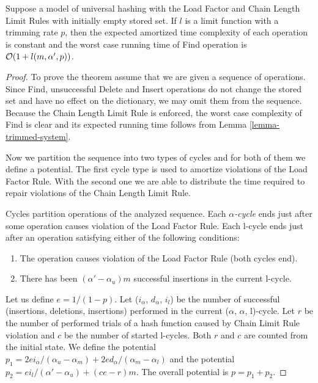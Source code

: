 \begin{theorem}
\label{theorem-amortised-expected-time}
Suppose a model of universal hashing with the Load Factor and Chain Length Limit Rules with initially empty stored set. If $l$ is a limit function with a trimming rate $p$, then the expected amortized time complexity of each operation is constant and the worst case running time of Find operation is $\mathcal{O}(1 + l(m, \alpha', p))$.
\end{theorem}
\begin{proof}
To prove the theorem assume that we are given a sequence of operations. Since Find, unsuccessful Delete and Insert operations do not change the stored set and have no effect on the dictionary, we may omit them from the sequence. Because the Chain Length Limit Rule is enforced, the worst case complexity of Find is clear and its expected running time follows from Lemma \ref{lemma-trimmed-system}.

Now we partition the sequence into two types of cycles and for both of them we define a potential. The first cycle type is used to amortize violations of the Load Factor Rule. With the second one we are able to distribute the time required to repair violations of the Chain Length Limit Rule.

\begin{definition}
Cycles partition operations of the analyzed sequence.
Each \emph{$\alpha$-cycle} ends just after some operation causes violation of the Load Factor Rule.
Each l-cycle ends just after an operation satisfying either of the following conditions:
\begin{enumerate}
\item The operation causes violation of the Load Factor Rule (both cycles end).
\item There has been $(\alpha' - \alpha_u) m$ successful insertions in the current l-cycle.
\end{enumerate}
\end{definition}

Let us define $e = 1/(1-p)$. Let ($i_{\alpha}$, $d_\alpha$, $i_l$) be the number of successful (insertions, deletions, insertions) performed in the current ($\alpha$, $\alpha$, l)-cycle. Let $r$ be the number of performed trials of a hash function caused by Chain Limit Rule violation and $c$ be the number of started l-cycles. Both $r$ and $c$ are counted from the initial state. We define the potential $p_1 = {2ei_{\alpha}}/{(\alpha_u - \alpha_m)} + {2ed_{\alpha}}/{(\alpha_m - \alpha_l)}$ and the potential $p_2 = {ei_{l}}/{(\alpha' - \alpha_u)} + (ce - r) m$.  The overall potential is $p = p_1 + p_2$.


\end{proof}
